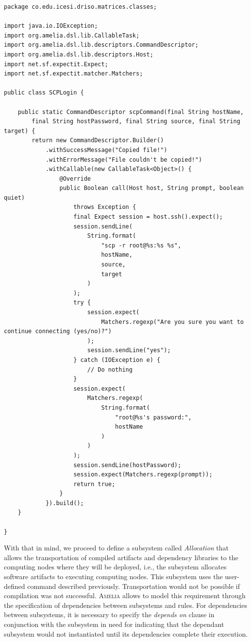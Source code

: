 \documentclass{article}
\newcommand\amelia[0]{\textsc{Amelia}}
\begin{document}
\begin{lstlisting}[style=amelia,caption=Class for defining a user-defined \amelia{} command.]
package co.edu.icesi.driso.matrices.classes;

import java.io.IOException;
import org.amelia.dsl.lib.CallableTask;
import org.amelia.dsl.lib.descriptors.CommandDescriptor;
import org.amelia.dsl.lib.descriptors.Host;
import net.sf.expectit.Expect;
import net.sf.expectit.matcher.Matchers;

public class SCPLogin {

	public static CommandDescriptor scpCommand(final String hostName,
	    final String hostPassword, final String source, final String target) {
		return new CommandDescriptor.Builder()
		    .withSuccessMessage("Copied file!")
			.withErrorMessage("File couldn't be copied!")
			.withCallable(new CallableTask<Object>() {
				@Override
				public Boolean call(Host host, String prompt, boolean quiet)
				    throws Exception {
					final Expect session = host.ssh().expect();
					session.sendLine(
					    String.format(
					        "scp -r root@%s:%s %s",
					        hostName,
					        source,
					        target
					    )
					);
					try {
						session.expect(
						    Matchers.regexp("Are you sure you want to continue connecting (yes/no)?")
						);
						session.sendLine("yes");
					} catch (IOException e) {
					    // Do nothing
					}
					session.expect(
					    Matchers.regexp(
					        String.format(
					            "root@%s's password:",
					            hostName
					        )
					    )
					);
					session.sendLine(hostPassword);
					session.expect(Matchers.regexp(prompt));
					return true;
				}
			}).build();
	}

}

\end{lstlisting}

With that in mind, we proceed to define a subsystem called \textit{Allocation} that allows the transportation of compiled artifacts and dependency libraries to the computing nodes where they will be deployed, i.e., the subsystem allocates software artifacts to executing computing nodes. This subsystem uses the user-defined command described previously. Transportation would not be possible if compilation was not successful. \amelia{} allows to model this requirement through the specification of dependencies between subsystems and rules. For dependencies between subsystems, it is necessary to specify the \textit{depends on} clause in conjunction with the subsystem in need for indicating that the dependant subsystem would not instantiated until its dependencies complete their execution. \\
\end{document}
